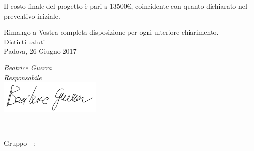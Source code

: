 \begin{titlepage}
	\begin{large}
		
	Il costo finale del progetto è pari a 13500€, coincidente con quanto dichiarato nel preventivo iniziale.
	
	Rimango a Vostra completa disposizione per ogni ulteriore chiarimento. \\
	Distinti saluti\\
	 
	Padova, 26 Giugno 2017
	\begin{flushright}
		\emph{Beatrice Guerra} \\ 
		\emph{Responsabile \GroupName{}} \\
		\includegraphics[width=5cm]{../../firme/BG.png}
 	\end{flushright}
	
	\end{large}
	
	\vspace{1cm} 
	\begin{center}
		\rule{13cm}{0,03cm} \\
		Gruppo \GroupName{} - \email: \GroupEmail{}
	\end{center} 
	
	\vspace{0.2cm}
	
\end{titlepage}
  
 \restoregeometry

